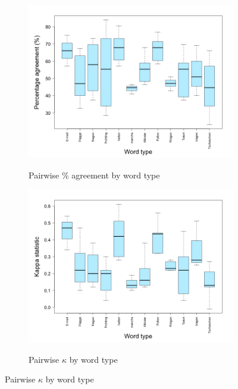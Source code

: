 		
		\begin{figure}[phtb]
			\centering
			
%			
			
			\begin{subfigure}{\textwidth}
				\centering
				\caption{Pairwise \% agreement by word type}
				\includegraphics[width=.9\textwidth]{img/plots/pairwisePctByWord-noTitle}
				\label{fig:agreement:words:pct}
			\end{subfigure}%
			
			\begin{subfigure}{\textwidth}
				\centering
				\caption{Pairwise $\kappa$ by word type}
				\includegraphics[width=.9\textwidth]{img/plots/pairwiseKappaByWord-noTitle}
				\label{fig:agreement:words:k}
			\end{subfigure}%
			

\end{figure}

